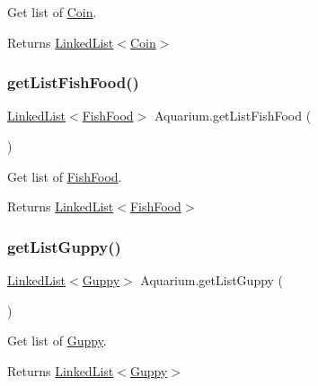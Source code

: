 Get list of \mbox{\hyperlink{class_coin}{Coin}}.

\begin{DoxyReturn}{Returns}
\mbox{\hyperlink{class_linked_list}{Linked\+List$<$\+Coin$>$}} 
\end{DoxyReturn}
\mbox{\label{class_aquarium_a1bdc2bc59b49bd0c09aed6a51552d5f2}} 
\subsubsection{\texorpdfstring{get\+List\+Fish\+Food()}{getListFishFood()}}
{\footnotesize\ttfamily \mbox{\hyperlink{class_linked_list}{Linked\+List}}$<$\mbox{\hyperlink{class_fish_food}{Fish\+Food}}$>$ Aquarium.\+get\+List\+Fish\+Food (\begin{DoxyParamCaption}{ }\end{DoxyParamCaption})\hspace{0.3cm}{\ttfamily [inline]}}

Get list of \mbox{\hyperlink{class_fish_food}{Fish\+Food}}.

\begin{DoxyReturn}{Returns}
\mbox{\hyperlink{class_linked_list}{Linked\+List$<$\+Fish\+Food$>$}} 
\end{DoxyReturn}
\mbox{\label{class_aquarium_ac0ff36aa463290ad45aff4faf6889056}} 
\subsubsection{\texorpdfstring{get\+List\+Guppy()}{getListGuppy()}}
{\footnotesize\ttfamily \mbox{\hyperlink{class_linked_list}{Linked\+List}}$<$\mbox{\hyperlink{class_guppy}{Guppy}}$>$ Aquarium.\+get\+List\+Guppy (\begin{DoxyParamCaption}{ }\end{DoxyParamCaption})\hspace{0.3cm}{\ttfamily [inline]}}

Get list of \mbox{\hyperlink{class_guppy}{Guppy}}.

\begin{DoxyReturn}{Returns}
\mbox{\hyperlink{class_linked_list}{Linked\+List$<$\+Guppy$>$}} 
\end{DoxyReturn}
\mbox{\label{class_aquarium_a168600416b33739a5943f44932325c29}} 
